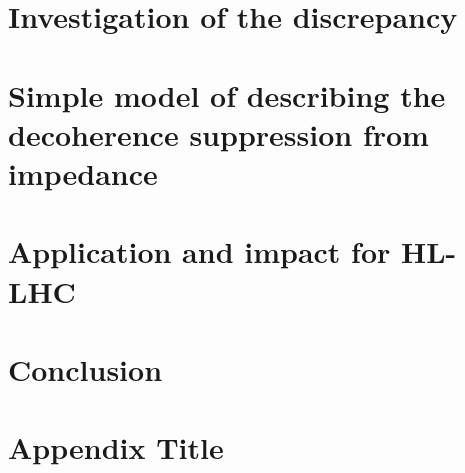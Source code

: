\documentclass[12pt,twoside]{report} %
\begin{document}
\chapter{Investigation of the discrepancy}


\chapter{Simple model of describing the decoherence suppression from impedance}


\chapter{Application and impact for HL-LHC}


\chapter{Conclusion}


\appendix
\chapter{Appendix Title}


\backmatter
\printbibliography
{}
\end{document}
